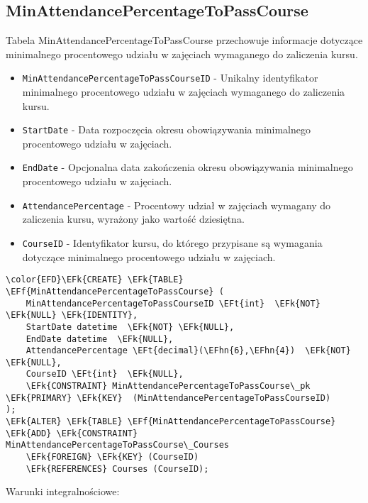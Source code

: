 \documentclass[11pt]{article}
\newcommand{\EFk}[1]{\textcolor{EFk}{\textbf{#1}}} %
\newcommand{\EFf}[1]{\textcolor{EFf}{#1}} %
\newcommand{\EFt}[1]{\textcolor{EFt}{\textbf{#1}}} %
\newcommand{\EFhn}[1]{\textcolor{EFhn}{#1}} %
\begin{document}
\subsection{MinAttendancePercentageToPassCourse}
\label{sec:orgde1d27f}
Tabela MinAttendancePercentageToPassCourse przechowuje informacje dotyczące minimalnego procentowego udziału w zajęciach wymaganego do zaliczenia kursu.
\begin{itemize}
\item \texttt{MinAttendancePercentageToPassCourseID} - Unikalny identyfikator minimalnego procentowego udziału w zajęciach wymaganego do zaliczenia kursu.
\item \texttt{StartDate} - Data rozpoczęcia okresu obowiązywania minimalnego procentowego udziału w zajęciach.
\item \texttt{EndDate} - Opcjonalna data zakończenia okresu obowiązywania minimalnego procentowego udziału w zajęciach.
\item \texttt{AttendancePercentage} - Procentowy udział w zajęciach wymagany do zaliczenia kursu, wyrażony jako wartość dziesiętna.
\item \texttt{CourseID} - Identyfikator kursu, do którego przypisane są wymagania dotyczące minimalnego procentowego udziału w zajęciach.
\end{itemize}
\begin{Code}
\begin{Verbatim}
\color{EFD}\EFk{CREATE} \EFk{TABLE} \EFf{MinAttendancePercentageToPassCourse} (
    MinAttendancePercentageToPassCourseID \EFt{int}  \EFk{NOT} \EFk{NULL} \EFk{IDENTITY},
    StartDate datetime  \EFk{NOT} \EFk{NULL},
    EndDate datetime  \EFk{NULL},
    AttendancePercentage \EFt{decimal}(\EFhn{6},\EFhn{4})  \EFk{NOT} \EFk{NULL},
    CourseID \EFt{int}  \EFk{NULL},
    \EFk{CONSTRAINT} MinAttendancePercentageToPassCourse\_pk \EFk{PRIMARY} \EFk{KEY}  (MinAttendancePercentageToPassCourseID)
);
\EFk{ALTER} \EFk{TABLE} \EFf{MinAttendancePercentageToPassCourse} \EFk{ADD} \EFk{CONSTRAINT} MinAttendancePercentageToPassCourse\_Courses
    \EFk{FOREIGN} \EFk{KEY} (CourseID)
    \EFk{REFERENCES} Courses (CourseID);
\end{Verbatim}
\end{Code}
Warunki integralnościowe:
\end{document}
